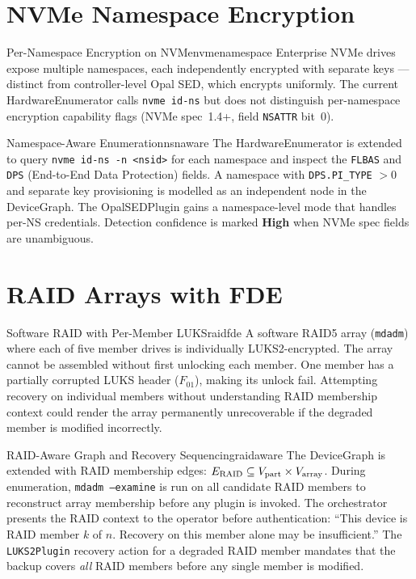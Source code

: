 \documentclass[11pt,a4paper]{report}
\begin{document}
\section{NVMe Namespace Encryption}

\begin{edgecase}{Per-Namespace Encryption on NVMe}{nvmenamespace}
Enterprise NVMe drives expose multiple namespaces, each independently encrypted with separate keys --- distinct from controller-level Opal SED, which encrypts uniformly. The current HardwareEnumerator calls \texttt{nvme id-ns} but does not distinguish per-namespace encryption capability flags (NVMe spec~1.4+, field \texttt{NSATTR} bit~0).
\end{edgecase}

\begin{solution}{Namespace-Aware Enumeration}{nsnaware}
The HardwareEnumerator is extended to query \texttt{nvme id-ns -n <nsid>} for each namespace and inspect the \texttt{FLBAS} and \texttt{DPS} (End-to-End Data Protection) fields. A namespace with \texttt{DPS.PI\_TYPE} $> 0$ and separate key provisioning is modelled as an independent node in the DeviceGraph. The OpalSEDPlugin gains a namespace-level mode that handles per-NS credentials. Detection confidence is marked \textbf{High} when NVMe spec fields are unambiguous.
\end{solution}

\section{RAID Arrays with FDE}

\begin{edgecase}{Software RAID with Per-Member LUKS}{raidfde}
A software RAID5 array (\texttt{mdadm}) where each of five member drives is individually LUKS2-encrypted. The array cannot be assembled without first unlocking each member. One member has a partially corrupted LUKS header ($F_{01}$), making its unlock fail. Attempting recovery on individual members without understanding RAID membership context could render the array permanently unrecoverable if the degraded member is modified incorrectly.
\end{edgecase}

\begin{solution}{RAID-Aware Graph and Recovery Sequencing}{raidaware}
The DeviceGraph is extended with RAID membership edges: $E_{\rm RAID} \subseteq V_{\rm part} \times V_{\rm array}$. During enumeration, \texttt{mdadm --examine} is run on all candidate RAID members to reconstruct array membership before any plugin is invoked. The orchestrator presents the RAID context to the operator before authentication: ``This device is RAID member $k$ of $n$. Recovery on this member alone may be insufficient.'' The \texttt{LUKS2Plugin} recovery action for a degraded RAID member mandates that the backup covers \emph{all} RAID members before any single member is modified.
\end{solution}
\end{document}
